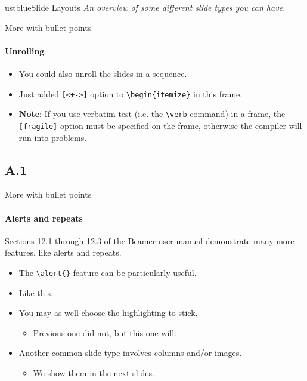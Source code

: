 \documentclass[]{beamer}
\newcommand{\hrefcol}[2]{\textcolor{uihteal}{\href{#1}{#2}}}
\begin{document}
\begin{chapter}{ustblue}{Slide Layouts}
\textit{An overview of some different slide types you can have.}
\end{chapter}


\begin{frame}[fragile]{More with bullet points}
\framesubtitle{Unrolling}
\begin{itemize}[<+->]
\item You could also unroll the slides in a sequence.
\item Just added \verb|[<+->]| option to \verb|\begin{itemize}| in this frame.
\item \textbf{Note}: If you use verbatim test (i.e. the \verb|\verb| command) in a frame, the \verb|[fragile]| option must be specified on the frame, otherwise the compiler will run into problems.
\end{itemize}
\end{frame}

\subsection{A.1}

\begin{frame}[fragile]{More with bullet points}
\framesubtitle{Alerts and repeats}
Sections 12.1 through 12.3 of the \hrefcol{https://www.ctan.org/tex-archive/macros/latex/contrib/beamer/doc/beameruserguide.pdf}{Beamer user
manual} demonstrate many more features, like alerts and repeats.
\begin{itemize}
\item The \verb|\alert{}| feature can be particularly useful.
\item Like \alert<2>{this}.
\item You may as well choose the highlighting to stick.
    \begin{itemize}
    \item Previous one did not, but \alert<3->{this one} will.
    \end{itemize}
\item Another common slide type involves columns and/or images.
    \begin{itemize}
    \item We show them in the \alert<4>{next slides}.
    \end{itemize}
\end{itemize}
\end{frame}
\end{document}
